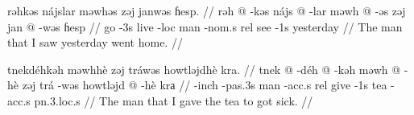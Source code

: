 \pex
\a
\begingl
\glpreamble rəhkəs nájslar məwhəs zəj janwəs ɦesp. //
\gla rəh @ -kəs nájs @ -lar məwh @ -əs zəj jan @ -wəs ɦesp //
\glb go -3s live -{\sc loc} man -{\sc nom}.s {\sc rel} see -1s yesterday //
\glft The man that I saw yesterday went home. //
\endgl

\a
\begingl
\glpreamble tnekdéhkəh məwhhè zəj tráwəs howtləjdhè kra. //
\gla tnek @ -déh @ -kəh məwh @ -hè zəj trá -wəs howtləjd @ -hè krа //
\glb {[be ill]} -{\sc inch} -{\sc pas}.3s man -{\sc acc}.s {\sc rel} give -1s
tea -{\sc acc}.s {\sc pn}.3.{\sc loc}.s //
\glft The man that I gave the tea to got sick. //
\endgl
\xe

